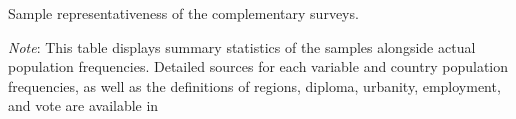 \begin{table}[h!]
    \caption{Sample representativeness of the complementary surveys.} \label{tab:representativeness_waves}
    \makebox[\textwidth][c]{
        \resizebox*{!}{.80\textheight}{%
        
        }
    }
    {\footnotesize \textit{Note}: This table displays summary statistics of the samples alongside actual population frequencies. %
    Detailed sources for each variable and country population frequencies, as well as the definitions of regions, diploma, urbanity, employment, and vote are available in %
    } %
\end{table}

